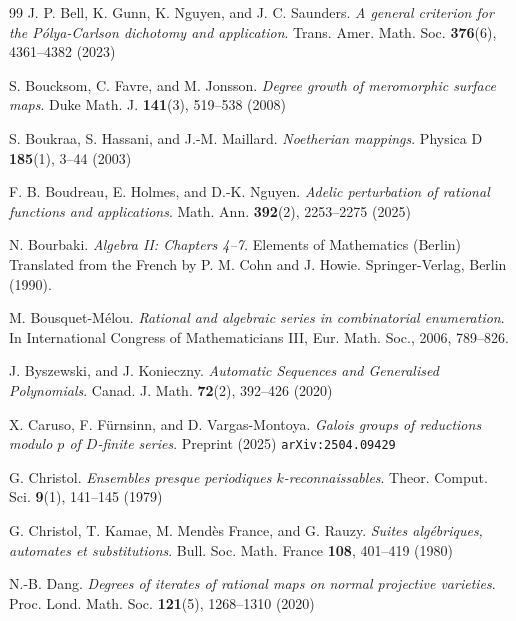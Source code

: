 \documentclass[11pt,a4paper]{article}
\theoremstyle{plain}
\theoremstyle{remark}
\theoremstyle{custombold}
\begin{document}
\begin{thebibliography}{99}
 J. P. Bell, K. Gunn, K. Nguyen, and J. C. Saunders. \textit{A general criterion for the P\'olya-Carlson dichotomy and application}. Trans. Amer. Math. Soc. \textbf{376}(6), 4361--4382 (2023)

 S. Boucksom, C. Favre, and M. Jonsson. \textit{Degree growth of meromorphic surface maps}. Duke Math. J. \textbf{141}(3), 519--538 (2008)




 S. Boukraa, S. Hassani, and J.-M. Maillard. \textit{Noetherian mappings}. Physica D \textbf{185}(1), 3--44 (2003)

 F. B. Boudreau, E. Holmes, and D.-K. Nguyen. \textit{Adelic perturbation of rational functions and applications}. Math. Ann. \textbf{392}(2), 2253--2275 (2025) 



 N. Bourbaki. \textit{Algebra II: Chapters 4--7.} Elements of Mathematics (Berlin) Translated from the French by P. M. Cohn and J. Howie. Springer-Verlag, Berlin (1990).



 M. Bousquet-M\'elou. \textit{Rational and algebraic series in combinatorial enumeration}. In International Congress of Mathematicians III, Eur. Math. Soc., 2006, 789--826.

 J. Byszewski, and J. Konieczny. \textit{Automatic Sequences and Generalised Polynomials}. Canad. J. Math. \textbf{72}(2), 392--426 (2020)





 X. Caruso, F. F\"{u}rnsinn, and D. Vargas-Montoya. \textit{Galois groups of reductions modulo $p$ of $D$-finite series}. Preprint (2025) \texttt{arXiv:2504.09429}

 G. Christol. \textit{Ensembles presque periodiques $k$-reconnaissables}. Theor. Comput. Sci. \textbf{9}(1), 141--145 (1979)

 G. Christol, T. Kamae, M. Mend\`es France, and G. Rauzy.  \textit{Suites alg\'ebriques, automates et substitutions}. Bull. Soc. Math. France \textbf{108}, 401--419 (1980)

 N.-B. Dang. \textit{Degrees of iterates of rational maps on normal projective varieties}. Proc. Lond. Math. Soc. \textbf{121}(5), 1268--1310 (2020)


\end{thebibliography}
\end{document}
